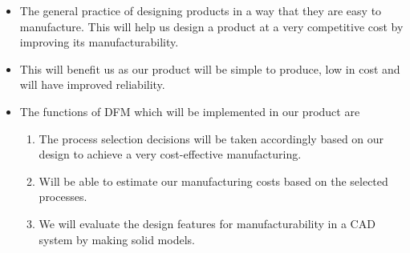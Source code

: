 \begin{itemize}

\item The general practice of designing products in a way that they        are easy to manufacture. This will help us design a product at       a very competitive cost by improving its manufacturability.

\item This will benefit us as our product will be simple to produce,       low in cost and will have improved reliability.

\item The functions of DFM which will be implemented in our product        are

      \begin{enumerate}
         
       \item The process selection decisions will be taken        accordingly based on our design to achieve a very cost-effective manufacturing.

       \item Will be able to estimate our manufacturing costs based on the selected processes.

       \item We will evaluate the design features for manufacturability in a CAD system by making solid models.
       
       \end{enumerate}
       
\end{itemize}